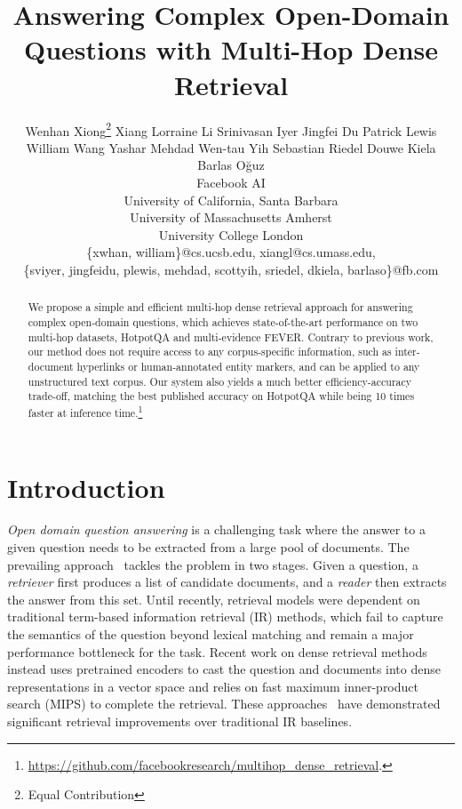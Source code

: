 \documentclass{article} \usepackage{iclr2021_conference,times}
\title{Answering Complex Open-Domain Questions with Multi-Hop Dense Retrieval}
\author{Wenhan Xiong\thanks{Equal Contribution} \And Xiang Lorraine Li \And Srinivasan Iyer \And Jingfei Du \And Patrick Lewis \And William Wang \And Yashar Mehdad \And Wen-tau Yih \And Sebastian Riedel \And Douwe Kiela \And Barlas O{\u{g}}uz \And \\
 Facebook AI \\
 University of California, Santa Barbara \\
 University of Massachusetts Amherst\\
 University College London \\
\{xwhan, william\}@cs.ucsb.edu, xiangl@cs.umass.edu, \\
\{sviyer, jingfeidu, plewis, mehdad, scottyih, sriedel, dkiela, barlaso\}@fb.com}
\begin{document}
\maketitle

\begin{abstract}
We propose a simple and efficient multi-hop dense retrieval approach for answering complex open-domain questions, which achieves state-of-the-art performance on two multi-hop datasets, HotpotQA and multi-evidence FEVER. Contrary to previous work, our method does not require access to any corpus-specific information, such as inter-document hyperlinks or human-annotated entity markers, and can be applied to any unstructured text corpus. Our system also yields a much better efficiency-accuracy trade-off, matching the best published accuracy on HotpotQA while being 10 times faster at inference time.\footnote{\url{https://github.com/facebookresearch/multihop_dense_retrieval}.}




\end{abstract}



\section{Introduction}




















\emph{Open domain question answering} is a challenging task where the answer to a given question needs to be extracted from a large pool of documents.  
The prevailing approach~\citep{drqa} tackles the problem in two stages. Given a question, a \emph{retriever} first produces a list of  candidate documents, and a \emph{reader} then extracts the answer from this set.
Until recently, retrieval models were dependent on traditional term-based information retrieval (IR) methods, which fail to capture the semantics of the question beyond lexical matching and remain a major performance bottleneck for the task. Recent work on dense retrieval methods instead uses pretrained encoders to cast the question and documents into dense representations in a vector space and relies on fast maximum inner-product search (MIPS) to complete the retrieval. These approaches~\citep{ORQA,REALM,DPR} have demonstrated significant retrieval improvements over traditional IR baselines.  
\end{document}
